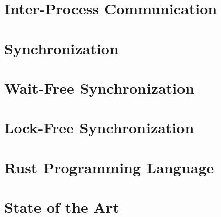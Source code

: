\section{Inter-Process Communication}



\section{Synchronization}

\section{Wait-Free Synchronization}

\section{Lock-Free Synchronization}

\section{Rust Programming Language}

\section{State of the Art}